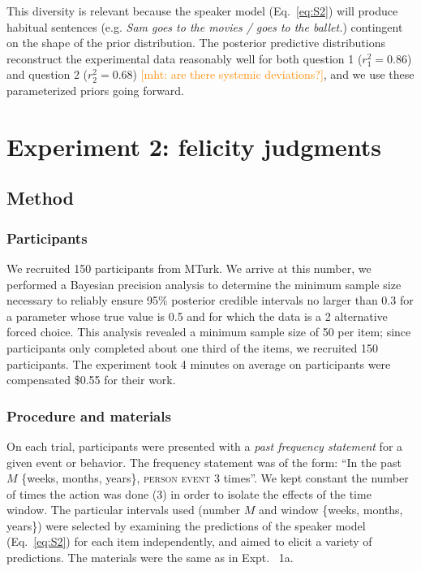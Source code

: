 \documentclass[10pt,letterpaper]{article}
\newcommand{\mht}[1]{\textcolor{DarkOrange}{[mht: #1]}}
\begin{document}
This diversity is relevant because the speaker model (Eq.~\ref{eq:S2}) will produce habitual sentences (e.g. \emph{Sam goes to the movies / goes to the ballet.}) contingent on the shape of the prior distribution. 
The posterior predictive distributions reconstruct the experimental data reasonably well for both question 1 ($r^2_{1} = 0.86$) and question 2 ($r^2_{2} = 0.68$) \mht{are there systemic deviations?}, and we use these parameterized priors going forward.


\section{Experiment 2: felicity judgments}

\subsection{Method}

\subsubsection{Participants}

We recruited 150 participants from MTurk.
We arrive at this number, we performed a Bayesian precision analysis to determine the minimum sample size necessary to reliably ensure 95\% posterior credible intervals no larger than 0.3 for a parameter whose true value is 0.5 and for which the data is a 2 alternative forced choice. This analysis revealed a minimum sample size of 50 per item; since participants only completed about one third of the items, we recruited 150 participants.
The experiment took 4 minutes on average on participants were compensated \$0.55 for their work.

\subsubsection{Procedure and materials}

On each trial, participants were presented with a \emph{past frequency statement} for a given event or behavior. 
The frequency statement was of the form: ``In the past $M$ \{weeks, months, years\}, \textsc{person} \textsc{event} 3 times''.
We kept constant the number of times the action was done (3) in order to isolate the effects of the time window. 
The particular intervals used (number $M$ and window \{weeks, months, years\}) were selected by examining the predictions of the speaker model (Eq.~\ref{eq:S2}) for each item independently, and aimed to elicit a variety of predictions.
The materials were the same as in Expt. ~1a.
\end{document}
